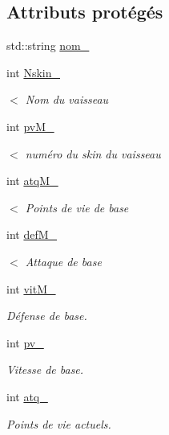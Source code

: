 \subsection*{Attributs protégés}
\begin{DoxyCompactItemize}
\item 
std\+::string \hyperlink{class_vaisseau_a2abb8ab70479bc486d19b563dddbe825}{nom\+\_\+}
\item 
int \hyperlink{class_vaisseau_af6b149a2f49de284503d5e3f80e2735a}{Nskin\+\_\+}
\begin{DoxyCompactList}\small\item\em $<$ Nom du vaisseau \end{DoxyCompactList}\item 
int \hyperlink{class_vaisseau_ac8b21f62b8c41f90864b1bca81d685de}{pv\+M\+\_\+}
\begin{DoxyCompactList}\small\item\em $<$ numéro du skin du vaisseau \end{DoxyCompactList}\item 
int \hyperlink{class_vaisseau_a24d3d623d4f470aa1a11222c3872b2ec}{atq\+M\+\_\+}
\begin{DoxyCompactList}\small\item\em $<$ Points de vie de base \end{DoxyCompactList}\item 
int \hyperlink{class_vaisseau_ad62e88bb7527f72a6a446d9bbb219744}{def\+M\+\_\+}
\begin{DoxyCompactList}\small\item\em $<$ Attaque de base \end{DoxyCompactList}\item 
int \hyperlink{class_vaisseau_a7cf3915f4d4044ee28fd5e5633fce11c}{vit\+M\+\_\+}
\begin{DoxyCompactList}\small\item\em Défense de base. \end{DoxyCompactList}\item 
int \hyperlink{class_vaisseau_ac57363910a13299dd8b10534683c0ad8}{pv\+\_\+}
\begin{DoxyCompactList}\small\item\em Vitesse de base. \end{DoxyCompactList}\item 
int \hyperlink{class_vaisseau_a2b2a2de0e527ed46550922427e067c95}{atq\+\_\+}
\begin{DoxyCompactList}\small\item\em Points de vie actuels. \end{DoxyCompactList}\item 

\end{DoxyCompactItemize}
